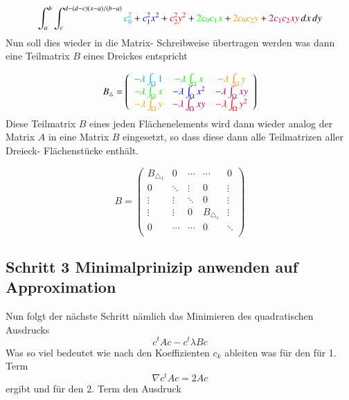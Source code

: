 \begin{equation}
			\int_a^b \int_c^{d-(d-c)(x-a)/(b-a)} \textcolor{cyan}{c_0^2} + \textcolor{blue}{c_1^2 x^2} + \textcolor{red}{c_2^2 y^2} + \textcolor{green}{2 c_0 c_1 x} + \textcolor{orange}{2 c_0 c_2 y} +\textcolor{purple}{ 2 c_1 c_2 xy} \, dx \, dy
			\label{fem:Minimal2LinAlgB}
\end{equation}
Nun soll dies wieder in die Matrix- Schreibweise übertragen werden was dann eine Teilmatrix $B$ eines Dreickes entspricht

\begin{equation}
 B_{\triangle} = \left( \begin{array}{ccc}
	\textcolor{cyan}{- \lambda \int_{\Omega} 1} &  \textcolor{green}{- \lambda \int_{\Omega} x} & \textcolor{orange}{- \lambda \int_{\Omega} y}  \\
	\textcolor{green}{- \lambda \int_{\Omega}x} & \textcolor{blue}{- \lambda \int_{\Omega} x^2} &  \textcolor{purple}{- \lambda \int_{\Omega} xy} \\
	\textcolor{orange}{- \lambda \int_{\Omega} y} & \textcolor{purple}{- \lambda \int_{\Omega} xy} & \textcolor{red}{ - \lambda \int_{\Omega} y^2} \\
	\end{array}\right)
	\label{fem:MatrixB}
\end{equation}
Diese Teilmatrix $B$ eines jeden Flächenelements wird dann wieder analog der Matrix $A$ in eine Matrix $B$ eingesetzt, so dass diese dann alle Teilmatrizen aller Dreieck-  Flächenstücke enthält.

\begin{equation}
B =	\begin{pmatrix}
	B_{\triangle_1} & 0 & \cdots & \cdots & 0 \\
	0 & \ddots & \vdots & 0 & \vdots \\
	\vdots & \vdots & \ddots & 0 & \vdots \\
	\vdots & \vdots & 0 & B_{\triangle_i} & \vdots \\
	0 & \cdots & \cdots & 0 &  \ddots \\
	\end{pmatrix}
\end{equation}


\subsection{Schritt 3 Minimalprinizip anwenden auf Approximation}

Nun folgt der nächste Schritt nämlich das Minimieren des quadratischen Ausdrucks
\begin{equation}
	c^t Ac - c^t \lambda Bc
\end{equation}
Was so viel bedeutet wie nach den Koeffizienten $c_k$ ableiten was für den  für 1. Term
\begin{equation}
	\nabla c^t Ac = 2Ac
\end{equation}
ergibt und für den 2. Term den Ausdruck

